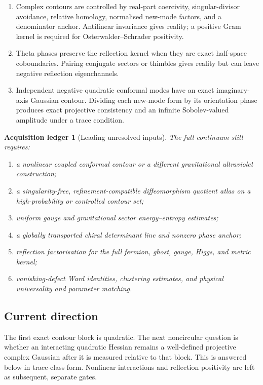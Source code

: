 \documentclass[11pt]{article}
\newtheorem{ledger}[theorem]{Acquisition ledger}
\theoremstyle{remark}
\begin{document}
\begin{enumerate}[leftmargin=2.2em]
      regulator cannot be removed while preserving both uniform
      \(L^r\) Einstein reweighting and nondegenerate fixed modes.
\item Complex contours are controlled by real-part coercivity,
      singular-divisor avoidance, relative homology, normalised
      new-mode factors, and a denominator anchor.  Antilinear
      invariance gives reality; a positive Gram kernel is required
      for Osterwalder--Schrader positivity.
\item Theta phases preserve the reflection kernel when they are exact
      half-space coboundaries.  Pairing conjugate sectors or thimbles
      gives reality but can leave negative reflection eigenchannels.
\item Independent negative quadratic conformal modes have an exact
      imaginary-axis Gaussian contour.  Dividing each new-mode form
      by its orientation phase produces exact projective consistency
      and an infinite Sobolev-valued amplitude under a trace
      condition.
\end{enumerate}

\begin{ledger}[Leading unresolved inputs]
\label{led:v12v1-open}
The full continuum still requires:
\begin{enumerate}
\item a nonlinear coupled conformal contour or a different
      gravitational ultraviolet construction;
\item a singularity-free, refinement-compatible diffeomorphism
      quotient atlas on a high-probability or controlled contour set;
\item uniform gauge and gravitational sector energy--entropy
      estimates;
\item a globally transported chiral determinant line and nonzero
      phase anchor;
\item reflection factorisation for the full fermion, ghost, gauge,
      Higgs, and metric kernel;
\item vanishing-defect Ward identities, clustering estimates, and
      physical universality and parameter matching.
\end{enumerate}
\end{ledger}

\subsection{Current direction}

The first exact contour block is quadratic.  The next noncircular
question is whether an interacting quadratic Hessian remains a
well-defined projective complex Gaussian after it is measured relative
to that block.  This is answered below in trace-class form.  Nonlinear
interactions and reflection positivity are left as subsequent,
separate gates.
\end{document}
